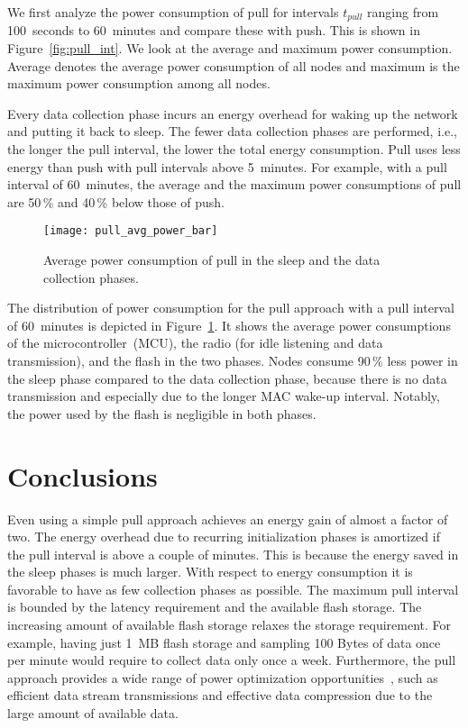 \documentclass[10pt]{sensys-abstract}
\begin{document}
We first analyze the power consumption of pull for intervals $t_{pull}$ ranging from 100~seconds to 60~minutes and compare these with push. This is shown in Figure~\ref{fig:pull_int}. We look at the average and maximum power consumption. Average denotes the average power consumption of all nodes and maximum is the maximum power consumption among all nodes.

Every data collection phase incurs an energy overhead for waking up the network and putting it back to sleep. The fewer data collection phases are performed, i.e., the longer the pull interval, the lower the total energy consumption. 
Pull uses less energy than push with pull intervals above 5~minutes. For example, with a pull interval of 60~minutes, the average and the maximum power consumptions of pull are 50$\,$\% and 40$\,$\% below those of push.

\begin{figure}
 \centering
 \texttt{[image: pull\_avg\_power\_bar]}
 \caption{Average power consumption of pull in the sleep and the data collection phases.}
 \label{fig:pull_power_bar}
\end{figure}

The distribution of power consumption for the pull approach with a pull interval of 60~minutes is depicted in Figure~\ref{fig:pull_power_bar}. It shows the average power consumptions of the microcontroller~(MCU), the radio (for idle listening and data transmission), and the flash in the two phases. Nodes consume 90$\,$\% less power in the sleep phase compared to the data collection phase, because there is no data transmission and especially due to the longer MAC wake-up interval. Notably, the power used by the flash is negligible in both phases.

\section{Conclusions}

Even using a simple pull approach achieves an energy gain of almost a factor of two. The energy overhead due to recurring initialization phases is amortized if the pull interval is above a couple of minutes. This is because the energy saved in the sleep phases is much larger. With respect to energy consumption it is favorable to have as few collection phases as possible. The maximum pull interval is bounded by the latency requirement and the available flash storage. The increasing amount of available flash storage relaxes the storage requirement. For example, having just 1~MB flash storage and sampling 100 Bytes of data once per minute would require to collect data only once a week. Furthermore, the pull approach provides a wide range of power optimization opportunities~\cite{Dutta2007}, such as efficient data stream transmissions and effective data compression due to the large amount of available data.
\end{document}
